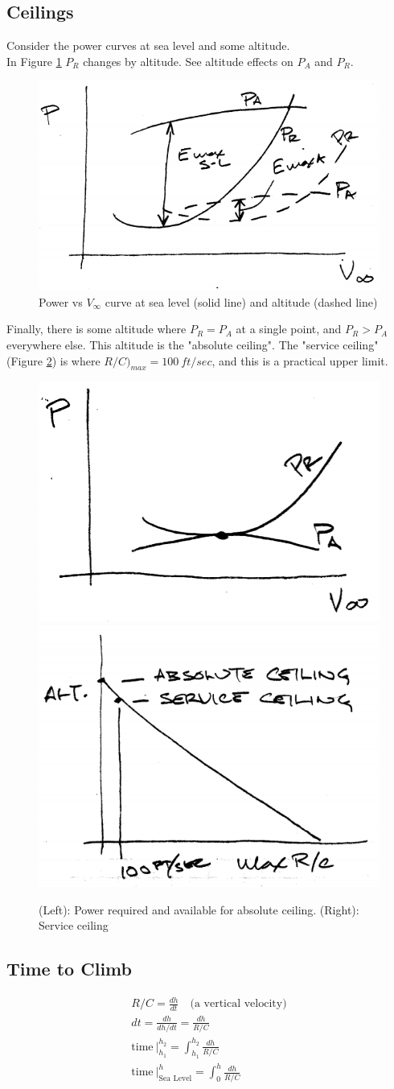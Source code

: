 \documentclass[draft=false, titlepage]{article}
\begin{document}
\subsection{Ceilings}
Consider the power curves at sea level and some altitude.\\
In Figure \ref{fig:p81_ceiling} $P_R$ changes by altitude. See altitude effects on $P_A$ and $P_R$.
\begin{figure}[ht]
	\centering
	\includegraphics[width=0.4\linewidth]{Figures/p81_ceiling.PNG}
	\caption{Power vs $V_\infty$ curve at sea level (solid line) and altitude (dashed line)}
	\label{fig:p81_ceiling}
\end{figure}
Finally, there is some altitude where $P_R = P_A$ at a single point, and $P_R > P_A$ everywhere else. This altitude is the "absolute ceiling". The "service ceiling" (Figure \ref{fig:p81_serviceCeiling}) is where $R/C\big)_{max} = 100\ ft/sec$, and this is a practical upper limit.
\begin{figure}[ht]
	\centering
	\includegraphics[width=0.3\linewidth]{Figures/p81_ceilingPower.PNG}
	\includegraphics[width=0.3\linewidth]{Figures/p81_serviceCeiling.PNG}
	\caption{(Left): Power required and available for absolute ceiling. (Right): Service ceiling}
	\label{fig:p81_serviceCeiling}
\end{figure}
\clearpage

\subsection{Time to Climb}
\begin{gather*}
R/C = \frac{dh}{dt} \quad \text{(a vertical velocity)}\\
dt = \frac{dh}{dh/dt} = \frac{dh}{R/C}\\
\text{time}\ \Big|_{h_1}^{h_2} = \int_{h_1}^{h_2}\frac{dh}{R/C}\\
\text{time}\ \Big|_{\text{Sea Level}}^{h} = \int_0^h \frac{dh}{R/C}
\end{gather*}
\end{document}
